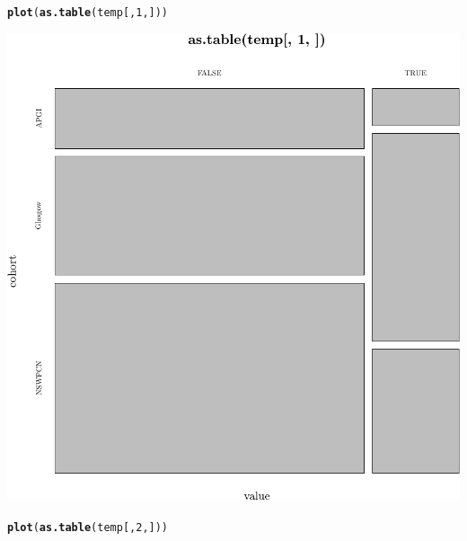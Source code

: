 \documentclass{article}\usepackage[]{graphicx}\usepackage[]{color}
\makeatletter
\def\maxwidth{ %
  \ifdim\Gin@nat@width>\linewidth
    \linewidth
  \else
    \Gin@nat@width
  \fi
}
\newcommand{\hlnum}[1]{\textcolor[rgb]{0.686,0.059,0.569}{#1}}%
\newcommand{\hlstd}[1]{\textcolor[rgb]{0.345,0.345,0.345}{#1}}%
\newcommand{\hlkwd}[1]{\textcolor[rgb]{0.737,0.353,0.396}{\textbf{#1}}}%
\newenvironment{kframe}{%
 \def\at@end@of@kframe{}%
 \ifinner\ifhmode%
  \def\at@end@of@kframe{\end{minipage}}%
  \begin{minipage}{\columnwidth}%
 \fi\fi%
 \def\FrameCommand##1{\hskip\@totalleftmargin \hskip-\fboxsep
 \colorbox{shadecolor}{##1}\hskip-\fboxsep
     \hskip-\linewidth \hskip-\@totalleftmargin \hskip\columnwidth}%
 \MakeFramed {\advance\hsize-\width
   \@totalleftmargin\z@ \linewidth\hsize
   \@setminipage}}%
 {\par\unskip\endMakeFramed%
 \at@end@of@kframe}
\newenvironment{knitrout}{}{} %
\makeatother
\begin{document}
\begin{knitrout}
{}


\begin{kframe}\begin{alltt}
\hlkwd{plot}\hlstd{(}\hlkwd{as.table}\hlstd{(temp[,}\hlnum{1}\hlstd{,]))}
\end{alltt}
\end{kframe}

{\centering \includegraphics[width=\maxwidth]{figure/07-data-summaries-2} 

}


\begin{kframe}\begin{alltt}
\hlkwd{plot}\hlstd{(}\hlkwd{as.table}\hlstd{(temp[,}\hlnum{2}\hlstd{,]))}
\end{alltt}
\end{kframe}


\end{knitrout}
\end{document}
